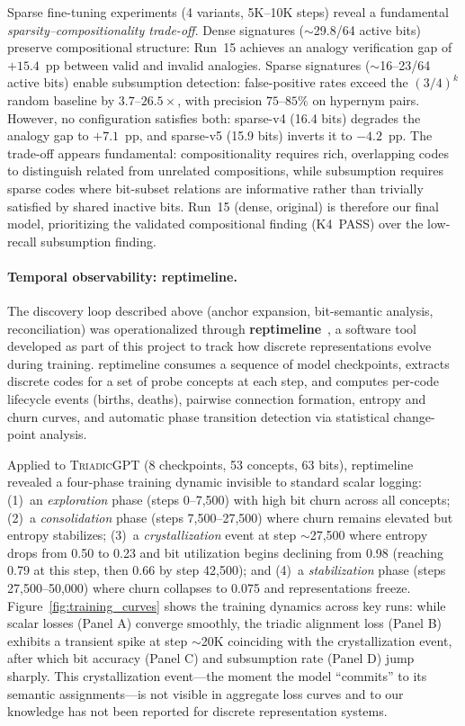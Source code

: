 \documentclass[11pt,a4paper]{article}
\newcommand{\microgpt}{\textsc{TriadicGPT}}
\begin{document}
Sparse fine-tuning experiments (4 variants, 5K--10K steps) reveal a fundamental \emph{sparsity--compositionality trade-off}. Dense signatures ($\sim$29.8/64 active bits) preserve compositional structure: Run~15 achieves an analogy verification gap of $+15.4$~pp between valid and invalid analogies. Sparse signatures ($\sim$16--23/64 active bits) enable subsumption detection: false-positive rates exceed the $(3/4)^k$ random baseline by $3.7$--$26.5\times$, with precision $75$--$85\%$ on hypernym pairs. However, no configuration satisfies both: sparse-v4 (16.4 bits) degrades the analogy gap to $+7.1$~pp, and sparse-v5 (15.9 bits) inverts it to $-4.2$~pp. The trade-off appears fundamental: compositionality requires rich, overlapping codes to distinguish related from unrelated compositions, while subsumption requires sparse codes where bit-subset relations are informative rather than trivially satisfied by shared inactive bits. Run~15 (dense, original) is therefore our final model, prioritizing the validated compositional finding (K4~PASS) over the low-recall subsumption finding.

\paragraph{Temporal observability: reptimeline.}
The discovery loop described above (anchor expansion, bit-semantic analysis, reconciliation) was operationalized through \textbf{reptimeline}~\citep{ornelas2026reptimeline}, a software tool developed as part of this project to track how discrete representations evolve during training. reptimeline consumes a sequence of model checkpoints, extracts discrete codes for a set of probe concepts at each step, and computes per-code lifecycle events (births, deaths), pairwise connection formation, entropy and churn curves, and automatic phase transition detection via statistical change-point analysis.

Applied to \microgpt{} (8 checkpoints, 53 concepts, 63 bits), reptimeline revealed a four-phase training dynamic invisible to standard scalar logging: (1)~an \emph{exploration} phase (steps 0--7,500) with high bit churn across all concepts; (2)~a \emph{consolidation} phase (steps 7,500--27,500) where churn remains elevated but entropy stabilizes; (3)~a \emph{crystallization} event at step $\sim$27,500 where entropy drops from 0.50 to 0.23 and bit utilization begins declining from 0.98 (reaching 0.79 at this step, then 0.66 by step 42{,}500); and (4)~a \emph{stabilization} phase (steps 27,500--50,000) where churn collapses to 0.075 and representations freeze. Figure~\ref{fig:training_curves} shows the training dynamics across key runs: while scalar losses (Panel A) converge smoothly, the triadic alignment loss (Panel B) exhibits a transient spike at step $\sim$20K coinciding with the crystallization event, after which bit accuracy (Panel C) and subsumption rate (Panel D) jump sharply. This crystallization event---the moment the model ``commits'' to its semantic assignments---is not visible in aggregate loss curves and to our knowledge has not been reported for discrete representation systems.
\end{document}
